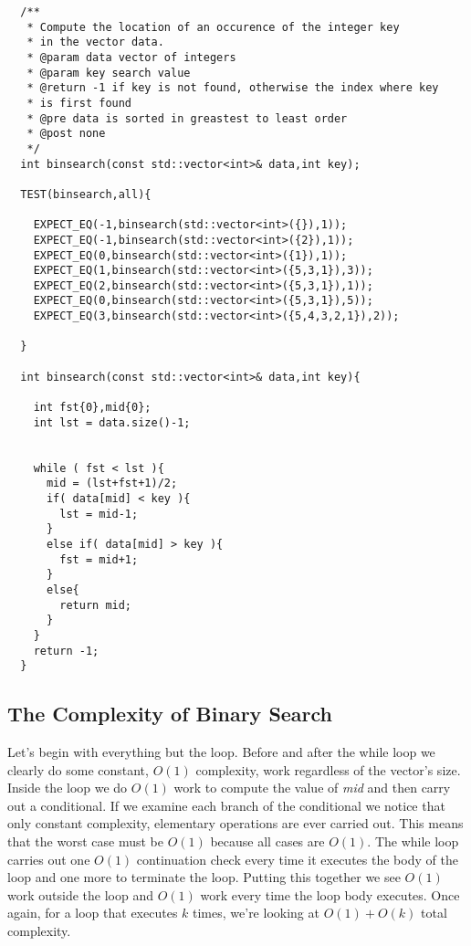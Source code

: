 \documentclass[]{tufte-handout}
\begin{document}
\begin{verbatim}
  /** 
   * Compute the location of an occurence of the integer key 
   * in the vector data. 
   * @param data vector of integers
   * @param key search value
   * @return -1 if key is not found, otherwise the index where key 
   * is first found
   * @pre data is sorted in greastest to least order
   * @post none
   */
  int binsearch(const std::vector<int>& data,int key);
  
  TEST(binsearch,all){
    
    EXPECT_EQ(-1,binsearch(std::vector<int>({}),1));
    EXPECT_EQ(-1,binsearch(std::vector<int>({2}),1));
    EXPECT_EQ(0,binsearch(std::vector<int>({1}),1));
    EXPECT_EQ(1,binsearch(std::vector<int>({5,3,1}),3));
    EXPECT_EQ(2,binsearch(std::vector<int>({5,3,1}),1));
    EXPECT_EQ(0,binsearch(std::vector<int>({5,3,1}),5));
    EXPECT_EQ(3,binsearch(std::vector<int>({5,4,3,2,1}),2));
    
  }

  int binsearch(const std::vector<int>& data,int key){

    int fst{0},mid{0};
	int lst = data.size()-1;
    

    while ( fst < lst ){
      mid = (lst+fst+1)/2;
      if( data[mid] < key ){
	    lst = mid-1;
      }
      else if( data[mid] > key ){
      	fst = mid+1;
      }
      else{
     	return mid;
      }
    }
    return -1;
  }

\end{verbatim}

\subsection{The Complexity of Binary Search}

Let's begin with everything but the loop.  Before and after the while loop we clearly do some constant, $O(1)$ complexity, work regardless of the vector's size. Inside the loop we do $O(1)$ work to compute the value of \textit{mid} and then carry out a conditional. If we examine each branch of the conditional we notice that only constant complexity, elementary operations are ever carried out. This means that the worst case must be $O(1)$ because all cases are $O(1)$. The while loop carries out one $O(1)$ continuation check every time it executes the body of the loop and one more to terminate the loop. Putting this together we see $O(1)$ work outside the loop and $O(1)$ work every time the loop body executes. Once again, for a loop that executes $k$ times, we're looking at $O(1)+O(k)$ total complexity. 
\end{document}
